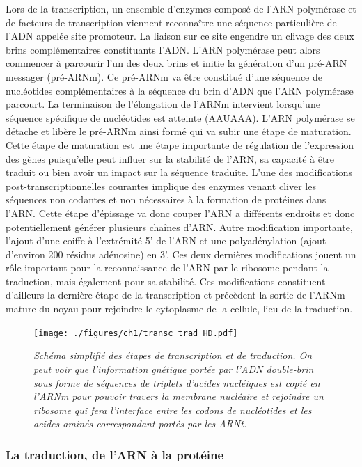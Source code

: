 Lors de la transcription, un ensemble d'enzymes composé de l'ARN polymérase et de facteurs de transcription viennent reconnaître une séquence particulière de l'ADN appelée site promoteur. La liaison sur ce site engendre un clivage des deux brins complémentaires constituants l'ADN. L'ARN polymérase peut alors commencer à parcourir l'un des deux brins et initie la génération d'un pré-ARN messager (pré-ARNm). Ce pré-ARNm va être constitué d'une séquence de nucléotides complémentaires à la séquence du brin d'ADN que l'ARN polymérase parcourt. La terminaison de l'élongation de l'ARNm intervient lorsqu’une séquence spécifique de nucléotides est atteinte (AAUAAA). L'ARN polymérase se détache et libère le pré-ARNm ainsi formé qui va subir une étape de maturation. Cette étape de maturation est une étape importante de régulation de l'expression des gènes puisqu'elle peut influer sur la stabilité de l'ARN, sa capacité à être traduit ou bien avoir un impact sur la séquence traduite. L'une des modifications post-transcriptionnelles courantes implique des enzymes venant cliver les séquences non codantes et non nécessaires à la formation de protéines dans l'ARN. Cette étape d'épissage va donc couper l'ARN a différents endroits et donc potentiellement générer plusieurs chaînes d'ARN. Autre modification importante, l'ajout d'une coiffe à l'extrémité 5' de l'ARN et une polyadénylation (ajout d'environ 200 résidus adénosine) en 3'. Ces deux dernières modifications jouent un rôle important pour la reconnaissance de l'ARN par le ribosome pendant la traduction, mais également pour sa stabilité. Ces modifications constituent d'ailleurs la dernière étape de la transcription et précèdent la sortie de l'ARNm mature du noyau pour rejoindre le cytoplasme de la cellule, lieu de la traduction.

\begin{figure}
  \centering
  {\texttt{[image: ./figures/ch1/transc\_trad\_HD.pdf]}}
    \caption{\it Schéma simplifié des étapes de transcription et de traduction. On peut voir que l'information gnétique portée par l'ADN double-brin sous forme de séquences de triplets d'acides nucléiques est copié en l'ARNm pour pouvoir travers la membrane nucléaire et rejoindre un ribosome qui fera l'interface entre les codons de nucléotides et les acides aminés correspondant portés par les ARNt.}
    \label{Fig:transc_trad_HD}
  \hspace{0.3cm}
\end{figure}


\subsubsection{La traduction, de l'ARN à la protéine}

